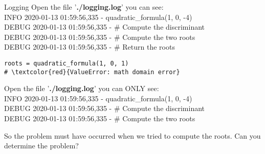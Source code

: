 \documentclass{beamer}
\begin{document}
\begin{frame}[fragile]{Logging}
Open the file '\textbf{./logging.log}' you can see:\\
INFO 2020-01-13 01:59:56,335 - quadratic\_formula(1, 0, -4)\\
DEBUG 2020-01-13 01:59:56,335 - \# Compute the discriminant\\
DEBUG 2020-01-13 01:59:56,335 - \# Compute the two roots\\
DEBUG 2020-01-13 01:59:56,335 - \# Return the roots\\
\begin{verbatim}
roots = quadratic_formula(1, 0, 1)
# \textcolor{red}{ValueError: math domain error}
\end{verbatim}
Open the file '\textbf{./logging.log}' you can ONLY see:\\
INFO 2020-01-13 01:59:56,335 - quadratic\_formula(1, 0, -4)\\
DEBUG 2020-01-13 01:59:56,335 - \# Compute the discriminant\\
DEBUG 2020-01-13 01:59:56,335 - \# Compute the two roots\par
\vspace{10pt}
So the problem must have occurred when we tried to compute the
roots. Can you determine the problem? 
\end{frame}
\end{document}
